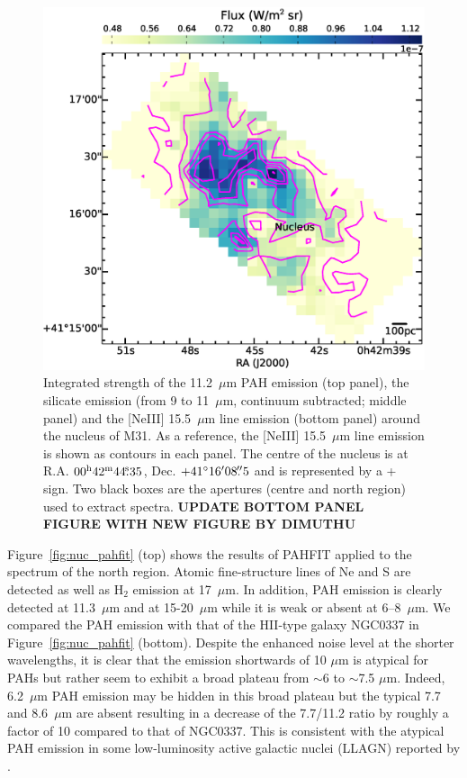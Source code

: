 \documentclass[useAMS,usenatbib,a4paper]{mn2e}
\begin{document}
\begin{figure}
\includegraphics[scale = 0.25]{./fig13c.eps}
\caption{
Integrated strength of the 11.2~$\mu$m PAH emission (top panel), the silicate emission (from 9 to 11~$\mu$m, continuum subtracted; middle panel) and the [NeIII] 15.5~$\mu$m line emission (bottom panel) around the nucleus of M31. As a reference, the [NeIII] 15.5~$\mu$m line emission is shown as contours in each panel. 
The centre of the nucleus is at R.A. $00^{\rm h}42^{\rm m}44\fs35$, Dec. $+41\hbox{$^\circ$}16\hbox{$^\prime$}08\hbox{$.\!\!^{\prime\prime}$}5$ \citep{NucleusREF} and is represented by a + sign.  
Two black boxes are the apertures (centre and north region) used to extract spectra.  
{\bf UPDATE BOTTOM PANEL FIGURE WITH NEW FIGURE BY DIMUTHU}
}
\label{nuc11}
\end{figure}


Figure~\ref{fig:nuc_pahfit} (top) shows the results of PAHFIT applied to the spectrum of the north region. Atomic fine-structure lines of Ne and S are detected as well as H$_2$ emission at 17~$\mu$m. In addition, PAH emission is clearly detected at 11.3~$\mu$m and at 15-20~$\mu$m while it is weak or absent at 6--8~$\mu$m. We compared the PAH emission with that of the HII-type galaxy NGC0337 in Figure~\ref{fig:nuc_pahfit} (bottom). Despite the enhanced noise level at the shorter wavelengths, it is clear that the emission shortwards of 10 $\mu$m is atypical for PAHs but rather seem to exhibit a broad plateau from $\sim$6 to $\sim$7.5 $\mu$m. Indeed, 6.2~$\mu$m  PAH emission may be hidden in this broad plateau but the typical 7.7 and 8.6~$\mu$m are absent resulting in a decrease of the 7.7/11.2 ratio by roughly a factor of 10 compared to that of NGC0337. This is consistent with the atypical PAH emission in some low-luminosity active galactic nuclei (LLAGN) reported by \citet{Smith:2007lr}.
\end{document}
